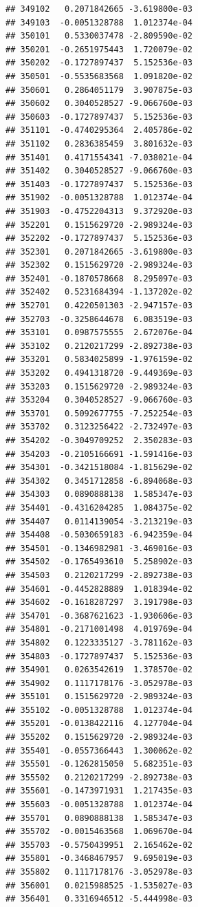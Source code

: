 \begin{frame}[fragile]
\begin{verbatim}
## 349102   0.2071842665 -3.619800e-03
## 349103  -0.0051328788  1.012374e-04
## 350101   0.5330037478 -2.809590e-02
## 350201  -0.2651975443  1.720079e-02
## 350202  -0.1727897437  5.152536e-03
## 350501  -0.5535683568  1.091820e-02
## 350601   0.2864051179  3.907875e-03
## 350602   0.3040528527 -9.066760e-03
## 350603  -0.1727897437  5.152536e-03
## 351101  -0.4740295364  2.405786e-02
## 351102   0.2836385459  3.801632e-03
## 351401   0.4171554341 -7.038021e-04
## 351402   0.3040528527 -9.066760e-03
## 351403  -0.1727897437  5.152536e-03
## 351902  -0.0051328788  1.012374e-04
## 351903  -0.4752204313  9.372920e-03
## 352201   0.1515629720 -2.989324e-03
## 352202  -0.1727897437  5.152536e-03
## 352301   0.2071842665 -3.619800e-03
## 352302   0.1515629720 -2.989324e-03
## 352401  -0.1870578668  8.295097e-03
## 352402   0.5231684394 -1.137202e-02
## 352701   0.4220501303 -2.947157e-03
## 352703  -0.3258644678  6.083519e-03
## 353101   0.0987575555  2.672076e-04
## 353102   0.2120217299 -2.892738e-03
## 353201   0.5834025899 -1.976159e-02
## 353202   0.4941318720 -9.449369e-03
## 353203   0.1515629720 -2.989324e-03
## 353204   0.3040528527 -9.066760e-03
## 353701   0.5092677755 -7.252254e-03
## 353702   0.3123256422 -2.732497e-03
## 354202  -0.3049709252  2.350283e-03
## 354203  -0.2105166691 -1.591416e-03
## 354301  -0.3421518084 -1.815629e-02
## 354302   0.3451712858 -6.894068e-03
## 354303   0.0890888138  1.585347e-03
## 354401  -0.4316204285  1.084375e-02
## 354407   0.0114139054 -3.213219e-03
## 354408  -0.5030659183 -6.942359e-04
## 354501  -0.1346982981 -3.469016e-03
## 354502  -0.1765493610  5.258902e-03
## 354503   0.2120217299 -2.892738e-03
## 354601  -0.4452828889  1.018394e-02
## 354602  -0.1618287297  3.191798e-03
## 354701  -0.3687621623 -1.930606e-03
## 354801  -0.2171001498  4.019769e-04
## 354802   0.1223335127 -3.781162e-03
## 354803  -0.1727897437  5.152536e-03
## 354901   0.0263542619  1.378570e-02
## 354902   0.1117178176 -3.052978e-03
## 355101   0.1515629720 -2.989324e-03
## 355102  -0.0051328788  1.012374e-04
## 355201  -0.0138422116  4.127704e-04
## 355202   0.1515629720 -2.989324e-03
## 355401  -0.0557366443  1.300062e-02
## 355501  -0.1262815050  5.682351e-03
## 355502   0.2120217299 -2.892738e-03
## 355601  -0.1473971931  1.217435e-03
## 355603  -0.0051328788  1.012374e-04
## 355701   0.0890888138  1.585347e-03
## 355702  -0.0015463568  1.069670e-04
## 355703  -0.5750439951  2.165462e-02
## 355801  -0.3468467957  9.695019e-03
## 355802   0.1117178176 -3.052978e-03
## 356001   0.0215988525 -1.535027e-03
## 356401   0.3316946512 -5.444998e-03

\end{verbatim}
\end{frame}
